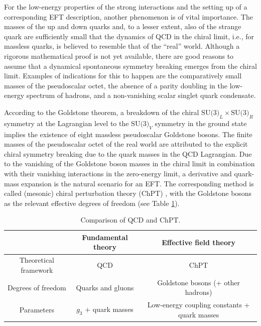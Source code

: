 \documentclass[twoside,12pt]{article}
\begin{document}
   For the low-energy properties of the strong interactions and the setting up of
a corresponding EFT description, another phenomenon is of vital importance.
   The masses of the up and down quarks and, to a lesser extent, also of the
strange quark are sufficiently small that the dynamics of QCD in the chiral
limit, i.e., for massless quarks, is believed to resemble that of the ``real'' world.
   Although a rigorous mathematical proof is not yet available, there are good reasons
to assume that a dynamical spontaneous symmetry breaking emerges from
the chiral limit.
   Examples of indications for this to happen are the comparatively small masses
of the pseudoscalar octet, the absence of a parity doubling in the low-energy spectrum
of hadrons, and a non-vanishing scalar singlet quark condensate.

   According to the Goldstone theorem, a breakdown of the chiral
$\mbox{SU(3)}_L\times\mbox{SU(3)}_R$ symmetry at the Lagrangian level to
the $\mbox{SU(3)}_V$ symmetry in the ground state implies the existence of
eight massless pseudoscalar Goldstone bosons.
   The finite masses of the pseudoscalar octet of the real world are attributed to
the explicit chiral symmetry breaking due to the quark masses in the QCD Lagrangian.
   Due to the vanishing of the Goldstone boson masses in the chiral limit
in combination with their vanishing interactions in the zero-energy limit, a
derivative and quark-mass expansion is the natural scenario for an EFT.
   The corresponding method is called (mesonic) chiral perturbation
theory (ChPT) \cite{Gasser:1983yg}, with the Goldstone bosons as the relevant effective
degrees of freedom (see Table \ref{1:table_QCD_EFT}).
\begin{table}[t]
\begin{center}
\renewcommand{\arraystretch}{1.5}
\begin{tabular}{c|c|c}
 &Fundamental theory & Effective field theory\\\hline
 Theoretical framework&QCD&ChPT\\\hline
 Degrees of freedom & Quarks and gluons & Goldstone bosons (+ other hadrons)\\
 \hline
 Parameters & $g_3$ + quark masses & Low-energy coupling constants + quark masses
\end{tabular}
\label{1:table_QCD_EFT}
\caption{Comparison of QCD and ChPT.}
\end{center}
\end{table}
\end{document}
